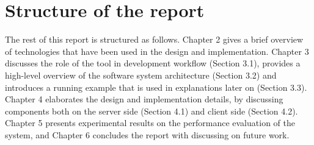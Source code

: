 \section{Structure of the report}
The rest of this report is structured as follows. Chapter 2 gives a brief
overview of technologies that have been used in the design and implementation.
Chapter 3 discusses the role of the tool in development workflow (Section 3.1),
provides a high-level overview of the software system architecture (Section 3.2)
and introduces a running example that is used in explanations later on (Section
3.3). Chapter 4 elaborates the design and implementation details, by discussing
components both on the server side (Section 4.1) and client side (Section 4.2).
Chapter 5 presents experimental results on the performance evaluation of the
system, and Chapter 6 concludes the report with discussing on future work.



